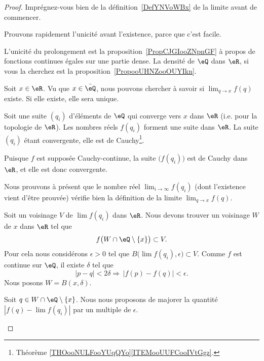 \begin{proof}
	Imprégnez-vous bien de la définition~\ref{DefYNVoWBx} de la limite avant de commencer.

	\begin{subproof}
		\spitem[Unicité]

		Prouvons rapidement l'unicité avant l'existence, parce que c'est facile.

		L'unicité du prolongement est la proposition~\ref{PropCJGIooZNpnGF} à propos de fonctions continues égales sur une partie dense. La densité de \( \eQ\) dans \( \eR\), si vous la cherchez est la proposition~\ref{PropooUHNZooOUYIkn}.

		Soit \( x\in \eR\). Vu que \( x\in \bar \eQ\), nous pouvons chercher à savoir si \( \lim_{q\to x} f(q) \) existe. Si elle existe, elle sera unique.

		Soit une suite \( (q_i)\) d'éléments de \( \eQ\) qui converge vers \( x\) dans \( \eR\) (i.e. pour la topologie de \( \eR\)). Les nombres réels \( f(q_i)\) forment une suite dans \( \eR\). La suite \( (q_i)\) étant convergente, elle est de Cauchy\footnote{Théorème \ref{THOooNULFooYUqQYo}\ref{ITEMooUUFCooIVtGgz}.}.

		Puisque \( f\) est supposée Cauchy-continue, la suite \(\big( f(q_i) \big)\) est de Cauchy dans \( \eR\), et elle est donc convergente.

		Nous prouvons à présent que le nombre réel \( \lim_{i\to \infty} f(q_i)\) (dont l'existence vient d'être prouvée) vérifie bien la définition de la limite \( \lim_{q\to x}f(q)\).

		Soit un voisinage \( V\) de \( \lim f(q_i)\) dans \( \eR\). Nous devons trouver un voisinage \( W\) de \( x\) dans \( \eR\) tel que
		\begin{equation}
			f\big( W\cap\eQ\setminus\{ x \} \big)\subset V.
		\end{equation}
		Pour cela nous considérons \( \epsilon>0\) tel que \( B\big( \lim f(q_i),\epsilon \big)\subset V\). Comme \( f\) est continue sur \( \eQ\), il existe \( \delta\) tel que
		\begin{equation}
			| p-q |<2\delta\Rightarrow\,| f(p)-f(q) |<\epsilon.
		\end{equation}
		Nous posons \( W=B(x,\delta)\).

		Soit \( q\in W\cap\eQ\setminus\{ x \}\). Nous nous proposons de majorer la quantité \( | f(q)-\lim f(q_i) |\) par un multiple de \( \epsilon\).


\end{subproof}
\end{proof}
